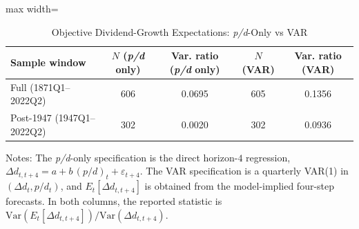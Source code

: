\begin{table}[t!]
    \centering
    \caption{Objective Dividend-Growth Expectations: \textit{p/d}-Only vs VAR}
    \label{tab:fact1_pd_vs_var}
    \begin{threeparttable}
    \footnotesize
    \begin{adjustbox}{max width=\textwidth}
    \begin{tabular}{lcccc}
    \toprule
    Sample window & $N$ (\textit{p/d} only) & Var. ratio (\textit{p/d} only) & $N$ (VAR) & Var. ratio (VAR) \\
    \midrule
    Full (1871Q1--2022Q2) & 606 & 0.0695 & 605 & 0.1356 \\
    Post-1947 (1947Q1--2022Q2) & 302 & 0.0020 & 302 & 0.0936 \\
    \bottomrule
    \end{tabular}
    \end{adjustbox}
    \begin{tablenotes}[flushleft]
    \item Notes: The \textit{p/d}-only specification is the direct horizon-$4$ regression, $\Delta d_{t,t+4}=a+b\,(p/d)_t+\varepsilon_{t+4}$. The VAR specification is a quarterly VAR(1) in $(\Delta d_t,p/d_t)$, and $E_t[\Delta d_{t,t+4}]$ is obtained from the model-implied four-step forecasts. In both columns, the reported statistic is $\mathrm{Var}\!\left(E_t[\Delta d_{t,t+4}]\right)\big/\mathrm{Var}\!\left(\Delta d_{t,t+4}\right)$.
    \end{tablenotes}
    \end{threeparttable}
\end{table}
